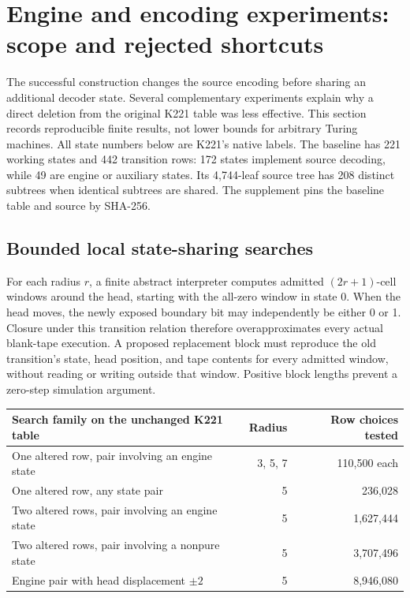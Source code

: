 \section{Engine and encoding experiments: scope and rejected shortcuts}
\label{sec:engine-encoding-audit}

The successful construction changes the source encoding before sharing an
additional decoder state.  Several complementary experiments explain why a
direct deletion from the original K221 table was less effective.  This section
records reproducible finite results, not lower bounds for arbitrary Turing
machines.  All state numbers below are K221's native labels.  The baseline has
221 working states and 442 transition rows: 172 states implement source
decoding, while 49 are engine or auxiliary states.  Its 4,744-leaf source tree
has 208 distinct subtrees when identical subtrees are shared.  The supplement
pins the baseline table and source by SHA-256.

\subsection{Bounded local state-sharing searches}

For each radius $r$, a finite abstract interpreter computes admitted
$(2r+1)$-cell windows around the head, starting with the all-zero window in
state 0.  When the head moves, the newly exposed boundary bit may independently
be either 0 or 1.  Closure under this transition relation therefore
overapproximates every actual blank-tape execution.  A proposed replacement
block must reproduce the old transition's state, head position, and tape
contents for every admitted window, without reading or writing outside that
window.  Positive block lengths prevent a zero-step simulation argument.

\begin{center}
\begin{tabular}{lrr}
Search family on the unchanged K221 table & Radius & Row choices tested\\
\hline
One altered row, pair involving an engine state & 3, 5, 7 & 110,500 each\\
One altered row, any state pair & 5 & 236,028\\
Two altered rows, pair involving an engine state & 5 & 1,627,444\\
Two altered rows, pair involving a nonpure state & 5 & 3,707,496\\
Engine pair with head displacement $\pm2$ & 5 & 8,946,080
\end{tabular}
\end{center}


